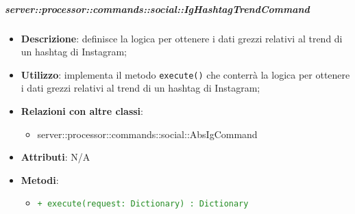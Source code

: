         \subparagraph{server::processor::commands::social::IgHashtagTrendCommand} %
        \label{subp:bdsm_app_server_processor_commands_social_ighashtagtrendcommand}
        \begin{itemize}
          \item \textbf{Descrizione}: definisce la logica per ottenere i dati grezzi relativi al trend di un hashtag di Instagram;
          \item \textbf{Utilizzo}: implementa il metodo \texttt{execute()} che conterrà la logica per ottenere i dati grezzi relativi al trend di un hashtag di Instagram;
          \item \textbf{Relazioni con altre classi}:
            \begin{itemize}
              \item server::processor::commands::social::AbsIgCommand
            \end{itemize}
					\item \textbf{Attributi}: N/A
				\item \textbf{Metodi}:
        	\begin{itemize}
          		\item \textcolor{forestgreen}{\texttt{+ execute(request: Dictionary) : Dictionary}}
        	\end{itemize}
        \end{itemize}

